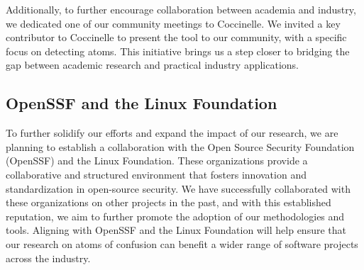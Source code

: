 \documentclass[conference]{IEEEtran}
\begin{document}
Additionally, to further encourage collaboration between 
academia and industry, we dedicated one of our community 
meetings to Coccinelle. We invited a key contributor to 
Coccinelle to present the tool to our community, with a 
specific focus on detecting atoms. This initiative brings us a 
step closer to bridging the gap between academic research and 
practical industry applications.

\subsection{OpenSSF and the Linux Foundation}

To further solidify our efforts and expand the impact of our 
research, we are planning to establish a collaboration with 
the Open Source Security Foundation (OpenSSF) and the Linux 
Foundation. These organizations provide a collaborative and 
structured environment that fosters innovation and 
standardization in open-source security. We have successfully 
collaborated with these organizations on other projects in the 
past, and with this established reputation, we aim to further 
promote the adoption of our methodologies and tools. Aligning 
with OpenSSF and the Linux Foundation will help ensure that 
our research on atoms of confusion can benefit a wider range 
of software projects across the industry.


{\scriptsize  }
\end{document}
